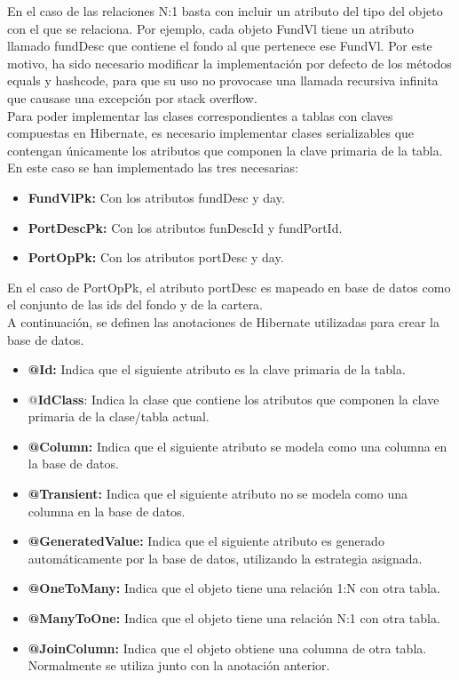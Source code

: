 \documentclass[12pt, a4paper]{book}
\begin{document}
\newpage

En el caso de las relaciones N:1 basta con incluir un atributo del tipo del objeto con el que se relaciona. Por ejemplo, cada objeto FundVl tiene un atributo llamado fundDesc que contiene el fondo al que pertenece ese FundVl. Por este motivo, ha sido necesario modificar la implementación por defecto de los métodos equals y hashcode, para que su uso no provocase una llamada recursiva infinita que causase una excepción por stack overflow.\\


Para poder implementar las clases correspondientes a tablas con claves compuestas en Hibernate, es necesario implementar clases serializables que contengan únicamente los atributos que componen la clave primaria de la tabla. En este caso se han implementado las tres necesarias: %

\begin{itemize}
	\item \textbf{FundVlPk:} Con los atributos fundDesc y day.
	\item \textbf{PortDescPk:} Con los atributos funDescId y fundPortId.
	\item \textbf{PortOpPk:} Con los atributos portDesc y day.
\end{itemize}

En el caso de PortOpPk, el atributo portDesc es mapeado en base de datos como el conjunto de las ids del fondo y de la cartera.\\

A continuación, se definen las anotaciones de Hibernate utilizadas para crear la base de datos.

\begin{itemize}
	\item \textbf{@Id:} Indica que el siguiente atributo es la clave primaria de la tabla.
	\item @\textbf{IdClass}: Indica la clase que contiene los atributos que componen la clave primaria de la clase/tabla actual.
	\item  \textbf{@Column:} Indica que el siguiente atributo se modela como una columna en la base de datos.
	\item  \textbf{@Transient:} Indica que el siguiente atributo no se modela como una columna en la base de datos.
	\item \textbf{@GeneratedValue:} Indica que el siguiente atributo es generado automáticamente por la base de datos, utilizando la estrategia asignada.
	\item \textbf{@OneToMany:} Indica que el objeto tiene una relación 1:N con otra tabla.
	\item\textbf{@ManyToOne:} Indica que el objeto tiene una relación N:1 con otra tabla.
	\item\textbf{@JoinColumn:} Indica que el objeto obtiene una columna de otra tabla. Normalmente se utiliza junto con la anotación anterior.\\
\end{itemize}
\end{document}
